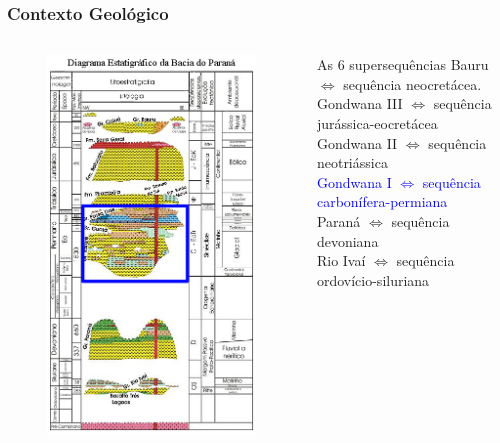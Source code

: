\documentclass[aspectratio=10]{beamer} %
\begin{document}
\begin{frame}
\frametitle{Contexto Geológico}
\begin{columns}
\begin{column}{0.4\textwidth}
\begin{figure}
\includegraphics[scale=0.36]{Imagens/diagramagondwanai.png}
\end{figure}
\end{column}
\begin{column}{0.75\textwidth}
\begin{block}{As $6$ supersequências}
Bauru $\Longleftrightarrow$  sequência neocretácea.\\
Gondwana III $\Longleftrightarrow$ sequência jurássica-eocretácea\\
Gondwana II $\Longleftrightarrow$ sequência neotriássica \\
\textcolor{blue}{Gondwana I $\Longleftrightarrow$ sequência carbonífera-permiana}\\ 
Paraná $\Longleftrightarrow$ sequência devoniana\\
Rio Ivaí $\Longleftrightarrow$ sequência ordovício-siluriana\\
\cite{Vail_1977,assine_1994,milani_orogenias_1998}
\end{block}
\end{column}
\end{columns}
\end{frame}
\end{document}
